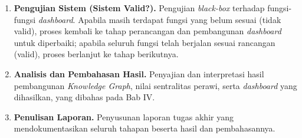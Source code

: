 \begin{enumerate}
	\item \textbf{Pengujian Sistem (Sistem Valid?).} Pengujian \textit{black-box} terhadap fungsi-fungsi \textit{dashboard}. Apabila masih terdapat fungsi yang belum sesuai (tidak valid), proses kembali ke tahap perancangan dan pembangunan \textit{dashboard} untuk diperbaiki; apabila seluruh fungsi telah berjalan sesuai rancangan (valid), proses berlanjut ke tahap berikutnya.
	\item \textbf{Analisis dan Pembahasan Hasil.} Penyajian dan interpretasi hasil pembangunan \textit{Knowledge Graph}, nilai sentralitas perawi, serta \textit{dashboard} yang dihasilkan, yang dibahas pada Bab IV.
	\item \textbf{Penulisan Laporan.} Penyusunan laporan tugas akhir yang mendokumentasikan seluruh tahapan beserta hasil dan pembahasannya.
\end{enumerate}

